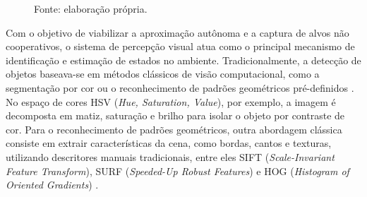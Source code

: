 \begin{figure}[H]
	
	\vspace{0.2cm}
	
	\begin{flushleft}
		\footnotesize Fonte: elaboração própria.
	\end{flushleft}
	
\end{figure}


Com o objetivo de viabilizar a aproximação autônoma e a captura de alvos não cooperativos, o sistema de percepção visual atua como o principal mecanismo de identificação e estimação de estados no ambiente. Tradicionalmente, a detecção de objetos baseava-se em métodos clássicos de visão computacional, como a segmentação por cor ou o reconhecimento de padrões geométricos pré-definidos \cite{zhao2019}. No espaço de cores HSV (\textit{Hue, Saturation, Value}), por exemplo, a imagem é decomposta em matiz, saturação e brilho para isolar o objeto por contraste de cor. Para o reconhecimento de padrões geométricos, outra abordagem clássica consiste em extrair características da cena, como bordas, cantos e texturas, utilizando descritores manuais tradicionais, entre eles SIFT (\textit{Scale-Invariant Feature Transform}), SURF (\textit{Speeded-Up Robust Features}) e HOG (\textit{Histogram of Oriented Gradients}) \cite{amjoud2023, zhao2019}.

